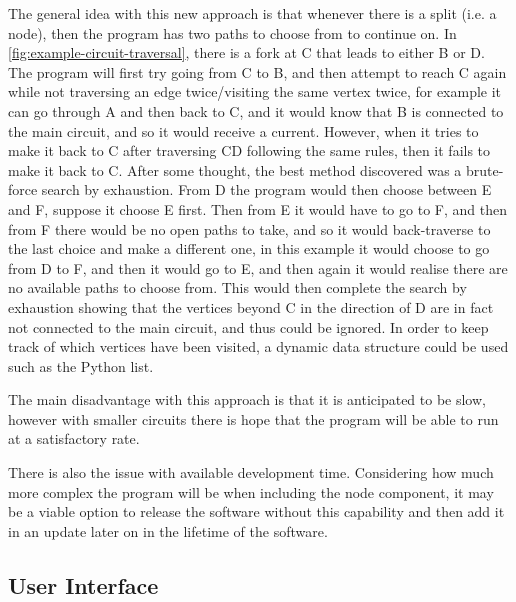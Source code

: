         The general idea with this new approach is that whenever there is a split (i.e. a node), then the program has two paths to choose from to continue on. 
        In \autoref{fig:example-circuit-traversal}, there is a fork at C that leads to either B or D. 
        The program will first try going from C to B, and then attempt to reach C again while not traversing an edge twice/visiting the same vertex twice, for example it can go through A and then back to C, and it would know that B is connected to the main circuit, and so it would receive a current.
        However, when it tries to make it back to C after traversing CD following the same rules, then it fails to make it back to C. 
        After some thought, the best method discovered was a brute-force search by exhaustion. From D the program would then choose between E and F, suppose it choose E first. 
        Then from E it would have to go to F, and then from F there would be no open paths to take, and so it would back-traverse to the last choice and make a different one, in this example it would choose to go from D to F, and then it would go to E, and then again it would realise there are no available paths to choose from. 
        This would then complete the search by exhaustion showing that the vertices beyond C in the direction of D are in fact not connected to the main circuit, and thus could be ignored.
        In order to keep track of which vertices have been visited, a dynamic data structure could be used such as the Python list. 
        
        The main disadvantage with this approach is that it is anticipated to be slow, however with smaller circuits there is hope that the program will be able to run at a satisfactory rate. 

        There is also the issue with available development time. 
        Considering how much more complex the program will be when including the node component, it may be a viable option to release the software without this capability and then add it in an update later on in the lifetime of the software. 


        
    \subsection{User Interface}

